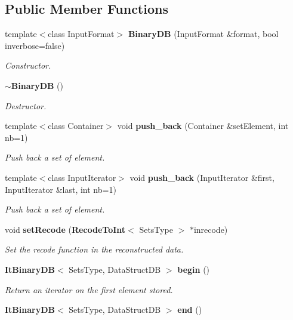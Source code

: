 \subsection*{Public Member Functions}
\begin{CompactItemize}
\item 
template$<$class Input\-Format$>$ {\bf Binary\-DB} (Input\-Format \&format, bool inverbose=false)
\begin{CompactList}\small\item\em Constructor. \item\end{CompactList}\item 
{\bf $\sim$Binary\-DB} ()\label{class_binary_d_b_f78c593365831c59be0862c601426dc9}

\begin{CompactList}\small\item\em Destructor. \item\end{CompactList}\item 
template$<$class Container$>$ void {\bf push\_\-back} (Container \&set\-Element, int nb=1)
\begin{CompactList}\small\item\em Push back a set of element. \item\end{CompactList}\item 
template$<$class Input\-Iterator$>$ void {\bf push\_\-back} (Input\-Iterator \&first, Input\-Iterator \&last, int nb=1)
\begin{CompactList}\small\item\em Push back a set of element. \item\end{CompactList}\item 
void {\bf set\-Recode} ({\bf Recode\-To\-Int}$<$ Sets\-Type $>$ $\ast$inrecode)\label{class_binary_d_b_374b531dec89c19bb50a2c3524c99da3}

\begin{CompactList}\small\item\em Set the recode function in the reconstructed data. \item\end{CompactList}\item 
{\bf It\-Binary\-DB}$<$ Sets\-Type, Data\-Struct\-DB $>$ {\bf begin} ()\label{class_binary_d_b_5add3a5a8f77c97c19be8a335c62783d}

\begin{CompactList}\small\item\em Return an iterator on the first element stored. \item\end{CompactList}\item 
{\bf It\-Binary\-DB}$<$ Sets\-Type, Data\-Struct\-DB $>$ {\bf end} ()\label{class_binary_d_b_33e5304e62ebff3fbf72f6088b800a97}


\end{CompactItemize}
